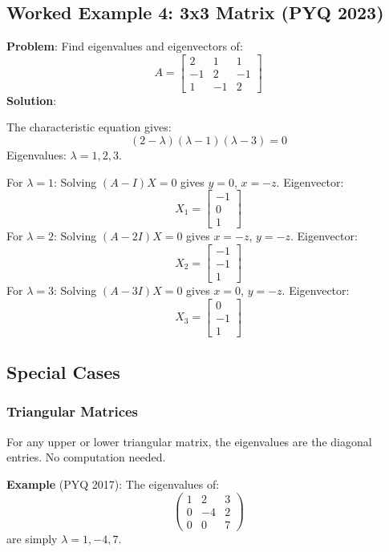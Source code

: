 \documentclass[
]{article}
\begin{document}
\subsection{Worked Example 4: 3x3 Matrix (PYQ
2023)}\label{worked-example-4-3x3-matrix-pyq-2023}

\textbf{Problem}: Find eigenvalues and eigenvectors of:
\[
A =
\begin{bmatrix}
2 & 1 & 1 \\
-1 & 2 & -1 \\
1 & -1 & 2
\end{bmatrix}
\]
\textbf{Solution}:

The characteristic equation gives:
\[
(2 - \lambda)(\lambda - 1)(\lambda - 3) = 0
\]
Eigenvalues: \(\lambda = 1, 2, 3\).

For \(\lambda = 1\): Solving \((A - I)X = 0\) gives \(y = 0\),
\(x = -z\). Eigenvector:
\[
X_1 =
\begin{bmatrix}
-1 \\
0 \\
1
\end{bmatrix}
\]
For \(\lambda = 2\): Solving \((A - 2I)X = 0\) gives \(x = -z\),
\(y = -z\). Eigenvector:
\[
X_2 =
\begin{bmatrix}
-1 \\
-1 \\
1
\end{bmatrix}
\]
For \(\lambda = 3\): Solving \((A - 3I)X = 0\) gives \(x = 0\),
\(y = -z\). Eigenvector:
\[
X_3 =
\begin{bmatrix}
0 \\
-1 \\
1
\end{bmatrix}
\]

\subsection{Special Cases}\label{special-cases}

\subsubsection{Triangular Matrices}\label{triangular-matrices}

For any upper or lower triangular matrix, the eigenvalues are the
diagonal entries. No computation needed.

\textbf{Example} (PYQ 2017): The eigenvalues of:
\[
\begin{pmatrix}
1 & 2 & 3 \\
0 & -4 & 2 \\
0 & 0 & 7
\end{pmatrix}
\]
are simply \(\lambda = 1, -4, 7\).
\end{document}
